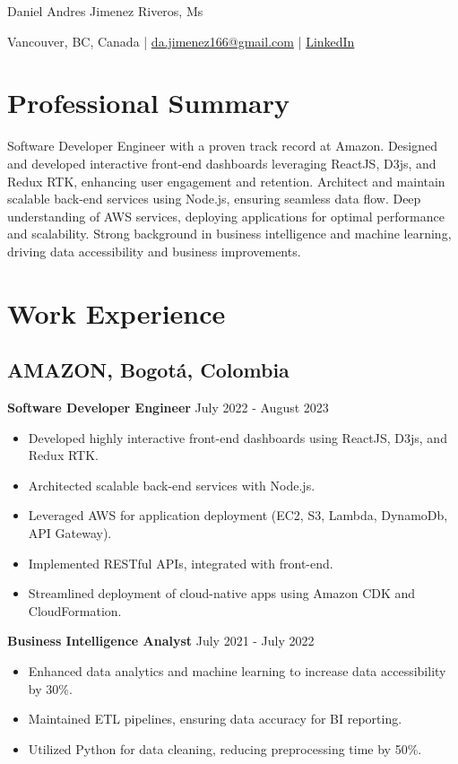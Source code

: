 \documentclass[11pt,a4paper]{article}
\begin{document}
\pagestyle{empty}

{\Huge Daniel Andres Jimenez Riveros, Ms}

Vancouver, BC, Canada | \href{mailto:da.jimenez166@gmail.com}{da.jimenez166@gmail.com} | \href{https://www.linkedin.com/in/daniel-jimenez-78500117a/}{LinkedIn}

\section*{Professional Summary}
Software Developer Engineer with a proven track record at Amazon. Designed and developed interactive front-end dashboards leveraging ReactJS, D3js, and Redux RTK, enhancing user engagement and retention. Architect and maintain scalable back-end services using Node.js, ensuring seamless data flow. Deep understanding of AWS services, deploying applications for optimal performance and scalability. Strong background in business intelligence and machine learning, driving data accessibility and business improvements.

\section*{Work Experience}

\subsection*{AMAZON, Bogotá, Colombia}
\textbf{Software Developer Engineer} \hfill July 2022 - August 2023
\begin{itemize}[noitemsep]
    \item Developed highly interactive front-end dashboards using ReactJS, D3js, and Redux RTK.
    \item Architected scalable back-end services with Node.js.
    \item Leveraged AWS for application deployment (EC2, S3, Lambda, DynamoDb, API Gateway).
    \item Implemented RESTful APIs, integrated with front-end.
    \item Streamlined deployment of cloud-native apps using Amazon CDK and CloudFormation.
\end{itemize}

\textbf{Business Intelligence Analyst} \hfill July 2021 - July 2022
\begin{itemize}[noitemsep]
    \item Enhanced data analytics and machine learning to increase data accessibility by 30\%.
    \item Maintained ETL pipelines, ensuring data accuracy for BI reporting.
    \item Utilized Python for data cleaning, reducing preprocessing time by 50\%.
\end{itemize}
\end{document}
